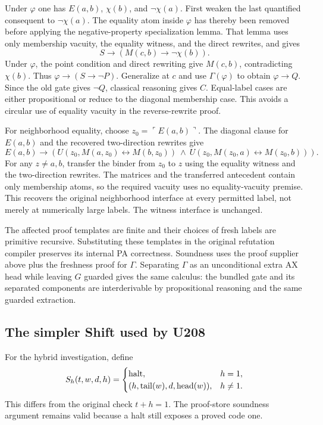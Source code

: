 Under $\varphi$ one has $E(a,b)$, $\chi(b)$, and $\neg\chi(a)$. First weaken the last quantified consequent to $\neg\chi(a)$. The equality atom inside $\varphi$ has thereby been removed before applying the negative-property specialization lemma. That lemma uses only membership vacuity, the equality witness, and the direct rewrites, and gives
\[
 S\to(M(c,b)\to\neg\chi(b)).
\]
Under $\varphi$, the point condition and direct rewriting give $M(c,b)$, contradicting $\chi(b)$. Thus $\varphi\to(S\to\neg P)$. Generalize at $c$ and use $\Gamma(\varphi)$ to obtain $\varphi\to Q$. Since the old gate gives $\neg Q$, classical reasoning gives $C$. Equal-label cases are either propositional or reduce to the diagonal membership case. This avoids a circular use of equality vacuity in the reverse-rewrite proof.

For neighborhood equality, choose $z_0=\ulcorner E(a,b)\urcorner$. The diagonal clause for $E(a,b)$ and the recovered two-direction rewrites give
\[
 E(a,b)\to\left(
 U(z_0,M(a,z_0)\leftrightarrow M(b,z_0))\ \wedge\
 U(z_0,M(z_0,a)\leftrightarrow M(z_0,b))\right).
\]
For any $z\ne a,b$, transfer the binder from $z_0$ to $z$ using the equality witness and the two-direction rewrites. The matrices and the transferred antecedent contain only membership atoms, so the required vacuity uses no equality-vacuity premise. This recovers the original neighborhood interface at every permitted label, not merely at numerically large labels. The witness interface is unchanged.

The affected proof templates are finite and their choices of fresh labels are primitive recursive. Substituting these templates in the original refutation compiler preserves its internal PA correctness. Soundness uses the proof supplier above plus the freshness proof for $\Gamma$. Separating $\Gamma$ as an unconditional extra AX head while leaving $G$ guarded gives the same calculus: the bundled gate and its separated components are interderivable by propositional reasoning and the same guarded extraction.

\subsection{The simpler Shift used by U208}
For the hybrid investigation, define
\[
 S_h(t,w,d,h)=
 \begin{cases}
 \text{halt},&h=1,\\
 (h,\operatorname{tail}(w),d,\operatorname{head}(w)),&h\ne1.
 \end{cases}
\]
This differs from the original check $t+h=1$. The proof-store soundness argument remains valid because a halt still exposes a proved code one.

